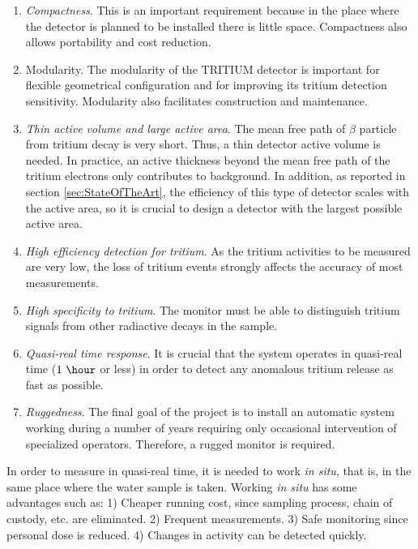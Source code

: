 \begin{enumerate}

\item{} \textit{Compactness}. This is an important requirement because in the place where the detector is planned to be installed there is little space. Compactness also allows portability and cost reduction.

\item{Modularity}. The modularity of the TRITIUM detector is important for flexible geometrical configuration and for improving its tritium detection sensitivity. Modularity also facilitates construction and maintenance.

\item{} \textit{Thin active volume and large active area}. The mean free path of $\beta$ particle from tritium decay is very short. Thus, a thin detector active volume is needed. In practice, an active thickness beyond the mean free path of the tritium electrons only contributes to background. In addition, as reported in section \ref{sec:StateOfTheArt}, the efficiency of this type of detector scales with the active area, so it is crucial to design a detector with the largest possible active area.

\item{} \textit{High efficiency detection for tritium}. As the tritium activities to be measured are very low, the loss of tritium events strongly affects the accuracy of most measurements.

\item{} \textit{High specificity to tritium}. The monitor must be able to distinguish tritium signals from other radiactive decays in the sample.

\item{} \textit{Quasi-real time response}. It is crucial that the system operates in quasi-real time ($1~\hour$ or less) in order to detect any anomalous tritium release as fast as possible. 

\item{} \textit{Ruggedness}. The final goal of the project is to install an automatic system working during a number of years requiring only occasional intervention of specialized operators. Therefore, a rugged monitor is required.

\end{enumerate}

In order to measure in quasi-real time, it is needed to work \textit{in situ}, that is, in the same place where the water sample is taken. Working \textit{in situ} has some advantages such as: 1) Cheaper running cost, since sampling process, chain of custody, etc. are eliminated. 2) Frequent measurements. 3) Safe monitoring since personal dose is reduced. 4) Changes in activity can be detected quickly.


